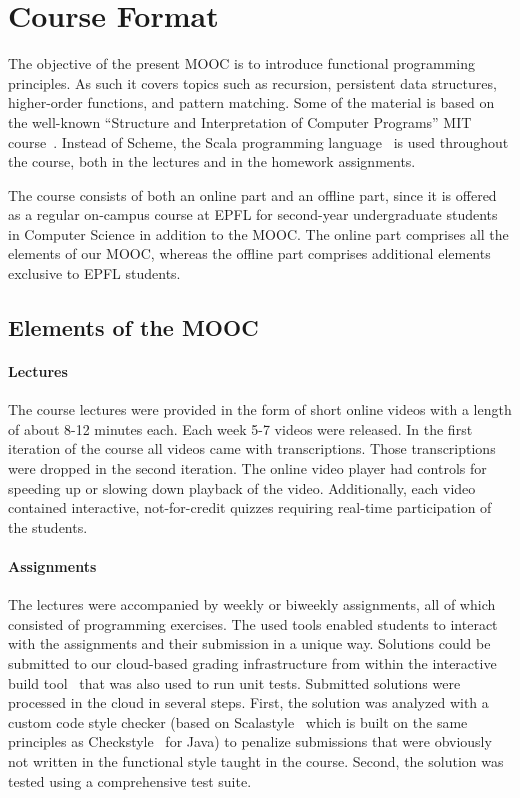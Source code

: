 \documentclass{sig-alternate}
\begin{document}
\section{Course Format}

The objective of the present MOOC is to introduce functional programming
principles. As such it covers topics such as recursion, persistent data
structures, higher-order functions, and pattern matching. Some of the material
is based on the well-known ``Structure and Interpretation of Computer
Programs'' MIT course~\cite{Abelson85}. Instead of Scheme, the Scala
programming language~\cite{Odersky-Spoon-Venners07} is used throughout the
course, both in the lectures and in the homework assignments.

The course consists of both an online part and an offline part, since it is
offered as a regular on-campus course at EPFL for second-year undergraduate
students in Computer Science in addition to the MOOC. The online part
comprises all the elements of our MOOC, whereas the offline part comprises
additional elements exclusive to EPFL students.

\subsection{Elements of the MOOC}\label{sec:mooc-elements}

\paragraph{Lectures} The course lectures were provided in the form of short
online videos with a length of about 8-12 minutes each. Each week 5-7 videos
were released. In the first iteration of the course all videos came with
transcriptions. Those transcriptions were dropped in the second iteration. The
online video player had controls for speeding up or slowing down playback of
the video. Additionally, each video contained interactive, not-for-credit
quizzes requiring real-time participation of the students.

\paragraph{Assignments}

The lectures were accompanied by weekly or biweekly assignments, all of which
consisted of programming exercises. The used tools enabled students to
interact with the assignments and their submission in a unique way. Solutions
could be submitted to our cloud-based grading infrastructure from within the
interactive build tool~\cite{sbt} that was also used to run unit tests.
Submitted solutions were processed in the cloud in several steps. First, the
solution was analyzed with a custom code style checker (based on
Scalastyle~\cite{ScalaStyle} which is built on the same principles as
Checkstyle~\cite{Ware08} for Java) to penalize submissions that were obviously
not written in the functional style taught in the course. Second, the solution
was tested using a comprehensive test suite.
\end{document}

